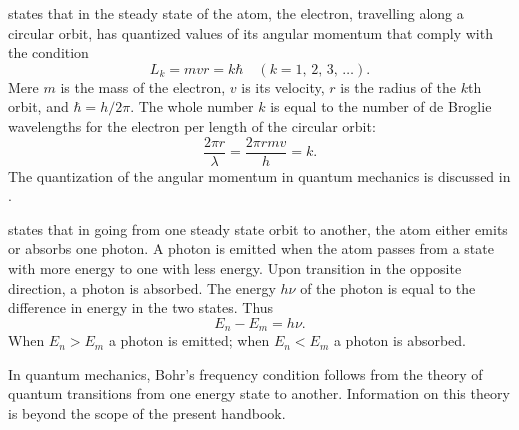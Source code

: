  states that in the steady state of the atom, the electron, travelling along a circular orbit, has quantized values of its angular momentum that comply with the condition
\begin{equation*}%
L_{k} = mvr = k \hbar \quad (k = 1,\, 2,\, 3,\,\ldots{}).
\end{equation*}
Mere $m$ is the mass of the electron, $v$ is its velocity, $r$ is the radius of the $k$th orbit, and $\hbar = h/2\pi$. The whole number $k$ is equal to the number of de Broglie wavelengths for the electron  per length of the circular orbit: 
\begin{equation*}%
\frac{2\pi r}{\lambda} = \frac{2 \pi r mv}{h} = k.
\end{equation*}
The quantization of the angular momentum in quantum mechanics
is discussed in .

 states that in going from one steady state orbit to another, the atom either emits or absorbs one photon. A photon is emitted when the atom passes from a state with more energy to one with less energy. Upon transition in the opposite direction, a photon is absorbed. The energy $h \nu$ of the photon is equal to the difference in energy in the two states. Thus
\begin{equation*}%
E_{n} - E_{m} = h\nu.
\end{equation*}
When $E_{n} > E_{m}$ a photon is emitted; when $E_{n} < E_{m}$ a photon is absorbed.

In quantum mechanics, Bohr's frequency condition follows from
the theory of quantum transitions from one energy state to
another. Information on this theory is beyond the scope of the
present handbook.

